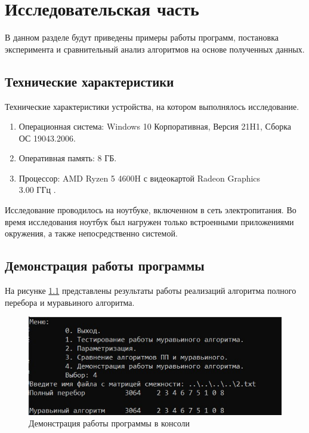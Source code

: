 \chapter{Исследовательская часть}

В данном разделе будут приведены примеры работы программ, постановка эксперимента и сравнительный анализ алгоритмов на основе полученных данных.

\section{Технические характеристики}

Технические характеристики устройства, на котором выполнялось исследование.

\begin{enumerate}
	\item Операционная система: Windows 10 Корпоративная, Версия	21H1, Сборка ОС 19043.2006.
	\item Оперативная память: 8 ГБ.
	\item Процессор: AMD Ryzen 5 4600H с видеокартой Radeon Graphics \\3.00 ГГц \cite{processor}.
\end{enumerate}

Исследование проводилось на ноутбуке, включенном в сеть электропитания. 
Во время исследования ноутбук был нагружен только встроенными приложениями окружения, а также непосредственно системой.

\section{Демонстрация работы программы}

На рисунке \ref{fig:democonsole} представлены результаты работы реализаций алгоритма полного перебора и муравьиного алгоритма.
\captionsetup{justification=centering, singlelinecheck=false}
\begin{figure}[H]
	\centering
	\includegraphics[width=1\linewidth]{inc/img/democonsole}
	\caption{Демонстрация работы программы в консоли}
	\label{fig:democonsole}
\end{figure}

